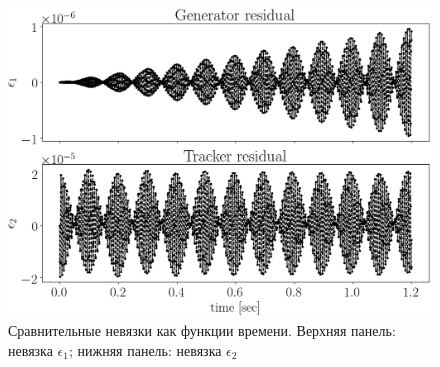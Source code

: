 \begin{figure}[h]
	\centering
	\includegraphics[height=.35\paperheight]{images/smp_sim/residual_vs_time(both)}
	\caption{Сравнительные невязки как функции времени.
		Верхняя панель: невязка $\epsilon_1$; нижняя панель: невязка $\epsilon_2$\label{fig:residuals}}
\end{figure}

